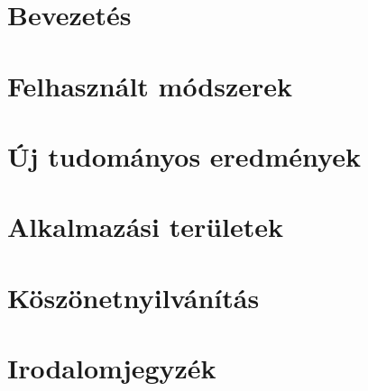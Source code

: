 \documentclass[twoside]{article}
\begin{document}


\section{Bevezetés}

 
\section{Felhasznált módszerek}


\section{Új tudományos eredmények}


\section{Alkalmazási területek}


\clearpage
\section*{Köszönetnyilvánítás}


\cleardoublepage
\section*{Irodalomjegyzék}

\end{document}
